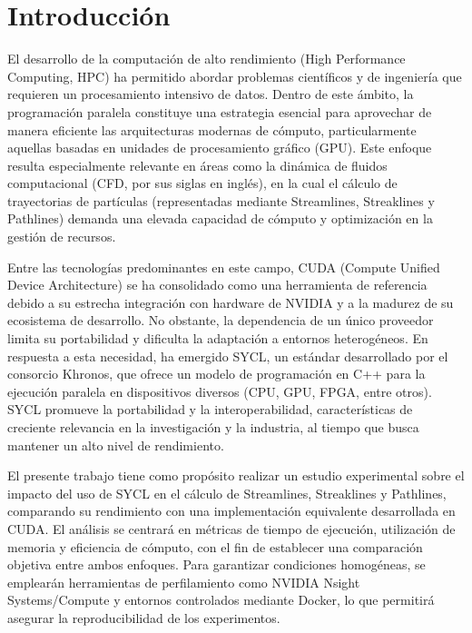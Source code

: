 \documentclass[12pt]{article}
\begin{document}


\justifying

\section{Introducción}

El desarrollo de la computación de alto rendimiento (High Performance Computing, HPC) ha permitido abordar problemas científicos y de ingeniería que requieren un procesamiento intensivo de datos. Dentro de este ámbito, la programación paralela constituye una estrategia esencial para aprovechar de manera eficiente las arquitecturas modernas de cómputo, particularmente aquellas basadas en unidades de procesamiento gráfico (GPU). Este enfoque resulta especialmente relevante en áreas como la dinámica de fluidos computacional (CFD, por sus siglas en inglés), en la cual el cálculo de trayectorias de partículas (representadas mediante Streamlines, Streaklines y Pathlines) demanda una elevada capacidad de cómputo y optimización en la gestión de recursos.


Entre las tecnologías predominantes en este campo, CUDA (Compute Unified Device Architecture) se ha consolidado como una herramienta de referencia debido a su estrecha integración con hardware de NVIDIA y a la madurez de su ecosistema de desarrollo. No obstante, la dependencia de un único proveedor limita su portabilidad y dificulta la adaptación a entornos heterogéneos. En respuesta a esta necesidad, ha emergido SYCL, un estándar desarrollado por el consorcio Khronos, que ofrece un modelo de programación en C++ para la ejecución paralela en dispositivos diversos (CPU, GPU, FPGA, entre otros). SYCL promueve la portabilidad y la interoperabilidad, características de creciente relevancia en la investigación y la industria, al tiempo que busca mantener un alto nivel de rendimiento.


El presente trabajo tiene como propósito realizar un estudio experimental sobre el impacto del uso de SYCL en el cálculo de Streamlines, Streaklines y Pathlines, comparando su rendimiento con una implementación equivalente desarrollada en CUDA. El análisis se centrará en métricas de tiempo de ejecución, utilización de memoria y eficiencia de cómputo, con el fin de establecer una comparación objetiva entre ambos enfoques. Para garantizar condiciones homogéneas, se emplearán herramientas de perfilamiento como NVIDIA Nsight Systems/Compute y entornos controlados mediante Docker, lo que permitirá asegurar la reproducibilidad de los experimentos.
\end{document}
